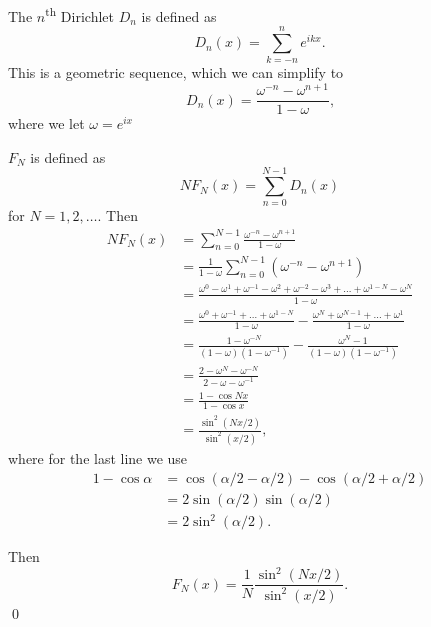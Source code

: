 \documentclass[oneside]{article}
\begin{document}
  The $n$\textsuperscript{th} Dirichlet $D_n$ is defined as\[
    D_n(x) = \sum_{k=-n}^n e^{ikx} \text{.}
  \] This is a geometric sequence, which we can simplify to \[
    D_n(x) = \frac{\omega^{-n} - \omega^{n+1}}{1-\omega} \text{,}
  \] where we let $\omega = e^{ix}$

  $F_N$ is defined as\[
    NF_N(x) = \sum_{n=0}^{N-1}D_n(x)
  \] for $N = 1, 2, \dots$. Then \begin{align*}
    NF_N(x)
    &= \sum_{n=0}^{N-1}\frac{\omega^{-n} - \omega^{n+1}}{1-\omega} \\
    &= \frac{1}{1-\omega} \sum_{n=0}^{N-1}
    \left(\omega^{-n} - \omega^{n+1}\right) \\
    &= \frac{\omega^0 - \omega^1 + \omega^{-1} - \omega^{2} + \omega^{-2} - \omega^{3} + \dots + \omega^{1-N} - \omega^{N}}{1-\omega} \\
    &= \frac{\omega^0 + \omega^{-1} +  \dots + \omega^{1-N}}{1-\omega} - \frac{\omega^{N} + \omega^{N-1} + \dots + \omega^1}{1-\omega} \\
    &= \frac{1 - \omega^{-N}}{(1-\omega)(1-\omega^{-1})}
    - \frac{\omega^N - 1}{(1-\omega)(1-\omega^{-1})} \\
    &= \frac{2 - \omega^N - \omega^{-N}}{2 - \omega - \omega^{-1}} \\
    &= \frac{1 - \cos Nx}{1 - \cos x} \\
    &= \frac{\sin^2(Nx/2)}{\sin^2(x/2)} \text{,}
  \end{align*} where for the last line we use\begin{align*}
    1 - \cos\alpha
    &= \cos(\alpha/2-\alpha/2) - \cos(\alpha/2+\alpha/2) \\
    &= 2\sin(\alpha/2)\sin(\alpha/2) \\
    &= 2\sin^2(\alpha/2) \text{.}
  \end{align*}

  Then \[
    F_N(x) = \frac1N \frac{\sin^2(Nx/2)}{\sin^2(x/2)} \text{.}
  \]\qed
\end{document}
